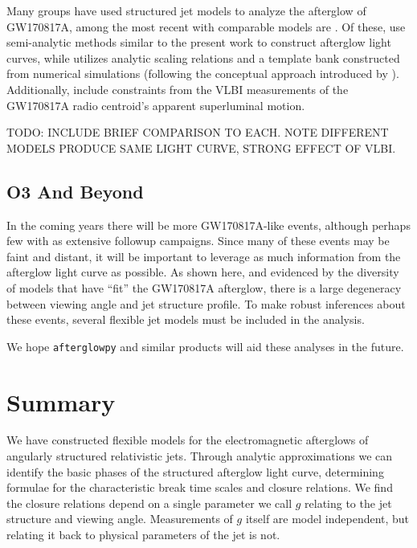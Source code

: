 \documentclass[twocolumn]{aastex62}
\newcommand{\gwbns}{GW170817A}
\newcommand{\afterglowpy}{{\tt afterglowpy}}
\begin{document}
Many groups have used structured jet models to analyze the afterglow of \gwbns{}, among the most recent with comparable models are \citet{Hotokezaka:2018aa, Ghirlanda:2019aa, Lamb:2019aa, Wu:2018aa}.  Of these, \citet{Hotokezaka:2018aa, Ghirlanda:2019aa, Lamb:2019aa} use semi-analytic methods similar to the present work to construct afterglow light curves, while \citet{Wu:2018aa} utilizes analytic scaling relations and a template bank constructed from numerical simulations (following the conceptual approach introduced by \citet{van-Eerten:2012ac}).  Additionally, \citet{Hotokezaka:2018aa, Ghirlanda:2019aa} include constraints from the VLBI measurements of the \gwbns{} radio centroid's apparent superluminal motion.

TODO: INCLUDE BRIEF COMPARISON TO EACH.  NOTE DIFFERENT MODELS PRODUCE SAME LIGHT CURVE, STRONG EFFECT OF VLBI.

\subsection{O3 And Beyond}

In the coming years there will be more \gwbns{}-like events, although perhaps few with as extensive followup campaigns.  Since many of these events may be faint and distant, it will be important to leverage as much information from the afterglow light curve as possible.  As shown here, and evidenced by the diversity of models that have ``fit'' the \gwbns{} afterglow, there is a large degeneracy between viewing angle and jet structure profile.  To make robust inferences about these events, several flexible jet models must be included in the analysis.  

We hope \afterglowpy{} and similar products will aid these analyses in the future.  

\section{Summary}\label{sec:summary}

We have constructed flexible models for the electromagnetic afterglows of angularly structured relativistic jets.  Through analytic approximations we can identify the basic phases of the structured afterglow light curve, determining formulae for the characteristic break time scales and closure relations.  We find the closure relations depend on a single parameter we call $g$ relating to the jet structure and viewing angle.  Measurements of $g$ itself are model independent, but relating it back to physical parameters of the jet is not.
\end{document}
